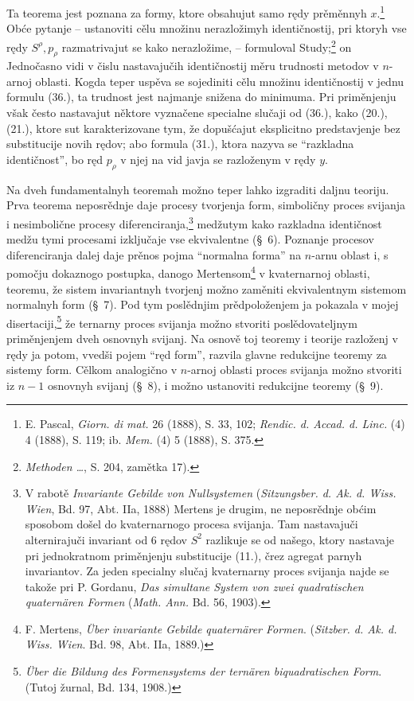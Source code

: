 \documentclass[11pt]{article}
\begin{document}
Ta teorema jest poznana za formy, ktore obsahujut samo rędy prěměnnyh $x$.\footnote{E. Pascal, \emph{Giorn. di mat.} 26 (1888), S. 33, 102; \emph{Rendic. d. Accad. d. Linc.} (4) 4 (1888), S. 119; ib. \emph{Mem.} (4) 5 (1888), S. 375.} Obće pytanje -- ustanoviti cělu množinu nerazložimyh identičnostij, pri ktoryh vse rędy $S^\rho,p_\rho$ razmatrivajut se kako nerazložime, -- formuloval Study;\footnote{\emph{Methoden \dots}, S. 204, zamětka 17).} on Jednočasno vidi v čislu nastavajučih identičnostij měru trudnosti metodov v $n$-arnoj oblasti. Kogda teper uspěva se sojediniti cělu množinu identičnostij v jednu formulu (36.), ta trudnost jest najmanje snižena do minimuma. Pri priměnjenju však često nastavajut něktore vyznačene specialne slučaji od (36.), kako (20.), (21.), ktore sut karakterizovane tym, že dopušćajut eksplicitno predstavjenje bez substitucije novih rędov; abo formula (31.), ktora nazyva se ``razkladna identičnost'', bo ręd $p_\rho$ v njej na vid javja se razloženym v rędy $y$.

Na dveh fundamentalnyh teoremah možno teper lahko izgraditi daljnu teoriju. Prva teorema neposrědnje daje procesy tvorjenja form, simboličny proces svijanja i nesimbolične procesy diferenciranja,\footnote{V rabotě \emph{Invariante Gebilde von Nullsystemen} (\emph{Sitzungsber. d. Ak. d. Wiss. Wien}, Bd. 97, Abt. IIa, 1888) Mertens je drugim, ne neposrědnje obćim sposobom došel do kvaternarnogo procesa svijanja. Tam nastavajuči alternirajuči invariant od 6 rędov $S^2$ razlikuje se od našego, ktory nastavaje pri jednokratnom priměnjenju substitucije (11.), črez agregat parnyh invariantov. Za jeden specialny slučaj kvaternarny proces svijanja najde se takože pri P. Gordanu, \emph{Das simultane System von zwei quadratischen quaternären Formen} (\emph{Math. Ann.} Bd. 56, 1903).} medžutym kako razkladna identičnost medžu tymi procesami izključaje vse ekvivalentne (\S\ 6). Poznanje procesov diferenciranja dalej daje prěnos pojma ``normalna forma'' na $n$-arnu oblast i, s pomočju dokaznogo postupka, danogo Mertensom\footnote{F. Mertens, \emph{Über invariante Gebilde quaternärer Formen}. (\emph{Sitzber. d. Ak. d. Wiss. Wien}. Bd. 98, Abt. IIa, 1889.)} v kvaternarnoj oblasti, teoremu, že sistem invariantnyh tvorjenj možno zaměniti ekvivalentnym sistemom normalnyh form (\S\ 7). Pod tym poslědnjim prědpoloženjem ja pokazala v mojej disertaciji,\footnote{\emph{Über die Bildung des Formensystems der ternären biquadratischen Form}. (Tutoj žurnal, Bd. 134, 1908.)} že ternarny proces svijanja možno stvoriti poslědovateljnym priměnjenjem dveh osnovnyh svijanj. Na osnově toj teoremy i teorije razloženj v rędy ja potom, vvedši pojem ``ręd form'', razvila glavne redukcijne teoremy za sistemy form. Cělkom analogično v $n$-arnoj oblasti proces svijanja možno stvoriti iz $n-1$ osnovnyh svijanj (\S\ 8), i možno ustanoviti redukcijne teoremy (\S\ 9).
\end{document}
